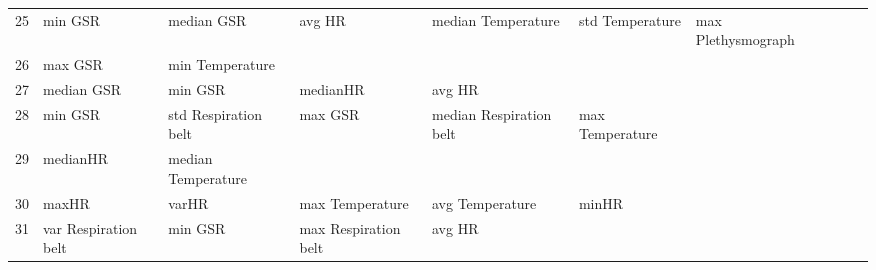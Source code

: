 \begin{landscape}
\begin{table}[]
\begin{tabular}{l|llllllll}
25       & min GSR                 & median GSR              & avg HR                  & median Temperature      & std Temperature         & max Plethysmograph    &                         &                         &                         &         \\
26       & max GSR                 & min Temperature         &                         &                         &                         &                       &                         &                         &                         &         \\
27       & median GSR              & min GSR                 & medianHR                & avg HR                  &                         &                       &                         &                         &                         &         \\
28       & min GSR                 & std Respiration belt    & max GSR                 & median Respiration belt & max Temperature         &                       &                         &                         &                         &         \\
29       & medianHR                & median Temperature      &                         &                         &                         &                       &                         &                         &                         &         \\
30       & maxHR                   & varHR                   & max Temperature         & avg Temperature         & minHR                   &                       &                         &                         &                         &         \\
31       & var Respiration belt    & min GSR                 & max Respiration belt    & avg HR                  &                         &                       &                         &                         &                         &         \\
\end{tabular}
\end{table}
\end{landscape}
\clearpage

